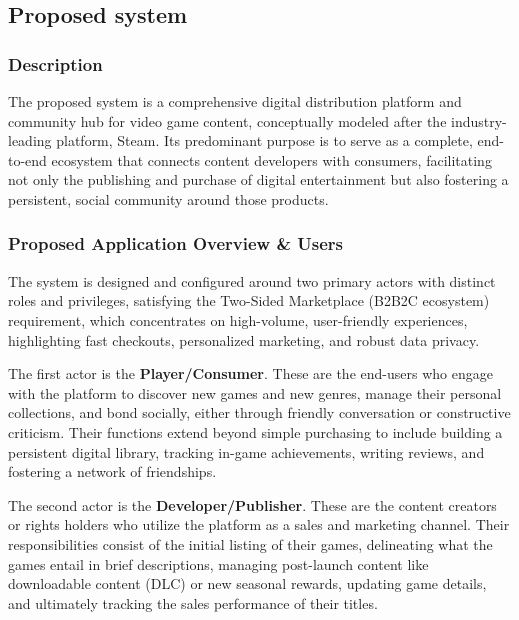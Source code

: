\subsection{Proposed system}

\subsubsection{Description}

The proposed system is a comprehensive digital distribution platform and community hub for video game content, conceptually modeled after the industry-leading platform, Steam. Its predominant purpose is to serve as a complete, end-to-end ecosystem that connects content developers with consumers, facilitating not only the publishing and purchase of digital entertainment but also fostering a persistent, social community around those products.

\subsubsection{Proposed Application Overview \& Users}

The system is designed and configured around two primary actors with distinct roles and privileges, satisfying the Two-Sided Marketplace (B2B2C ecosystem) requirement, which concentrates on high-volume, user-friendly experiences, highlighting fast checkouts, personalized marketing, and robust data privacy.

The first actor is the \textbf{Player/Consumer}. These are the end-users who engage with the platform to discover new games and new genres, manage their personal collections, and bond socially, either through friendly conversation or constructive criticism. Their functions extend beyond simple purchasing to include building a persistent digital library, tracking in-game achievements, writing reviews, and fostering a network of friendships.

The second actor is the \textbf{Developer/Publisher}. These are the content creators or rights holders who utilize the platform as a sales and marketing channel. Their responsibilities consist of the initial listing of their games, delineating what the games entail in brief descriptions, managing post-launch content like downloadable content (DLC) or new seasonal rewards, updating game details, and ultimately tracking the sales performance of their titles.

